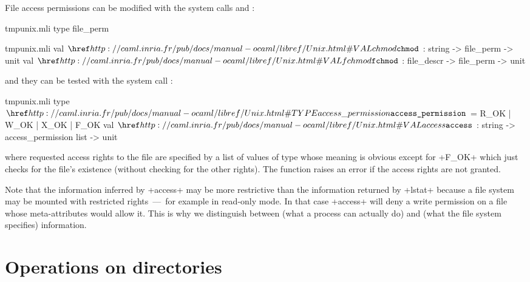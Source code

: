 File access permissions can be modified with the system calls
 and :
%
\begin{codefile}{tmpunix.mli}
type file_perm
\end{codefile}
%
\begin{listingcodefile}{tmpunix.mli}
val $\libvalue{Unix}{chmod}$ : string -> file_perm -> unit
val $\libvalue{Unix}{fchmod}$ : file_descr -> file_perm -> unit
\end{listingcodefile}
and they can be tested  with the system 
call :
%
\begin{listingcodefile}{tmpunix.mli}
type $\libtype{Unix}{access\_permission}$ = R_OK | W_OK | X_OK | F_OK
val $\libvalue{Unix}{access}$ : string -> access_permission list -> unit 
\end{listingcodefile}
%
where requested access rights to the file are specified by a list of
values of type  whose meaning is 
obvious except for \ml+F_OK+ which just checks for the file's
existence (without checking for the other rights). The function
raises an error if the access rights are not granted.

Note that the information inferred by \ml+access+ may be more
restrictive than the information returned by \ml+lstat+ because a file
system may be mounted with restricted rights~---~for example in
read-only mode. In that case \ml+access+ will deny a write permission
on a file whose meta-attributes would allow it. This is why we
distinguish between  (what a process can actually do)
and  (what the file system specifies) information.

\section{Operations on directories}

